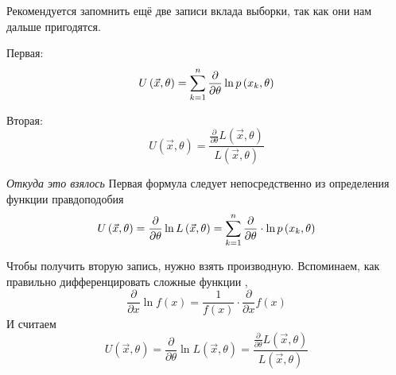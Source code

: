 \begin{remark}\label{remark:defU}
  Рекомендуется запомнить ещё две записи вклада выборки, так как они нам
  дальше пригодятся.

  Первая:
  \begin{align*}
    U\left( \vec{x},\theta \right)
    = \sum_{k=1}^n\frac{\partial}{\partial\theta}\ln{p\left(x_k,\theta\right)}
  \end{align*}

  Вторая:
  $$U\left( \vec{x},\theta \right)
    =\frac{\frac{\partial}{\partial\theta}L\left(\vec{x},\theta\right)}
      {L\left(\vec{x},\theta\right)}$$
\end{remark}
\textit{Откуда это взялось}
Первая формула следует непосредственно из определения функции правдоподобия
$$U\left( \vec{x},\theta \right)
    =\frac{\partial}{\partial\theta}\ln{L\left(\vec{x},\theta\right)}
    =\sum_{k=1}^n
      \frac{\partial}{\partial\theta}\cdot\ln{p\left(x_k,\theta\right)}$$

Чтобы получить вторую запись, нужно взять производную.
Вспоминаем, как правильно дифференцировать сложные функции
\cite[с.~226]{Fichtenholz1}, \cite[с.~133]{DorogovtsevMA}
$$\frac{\partial}{\partial x} \ln{f\left( x \right)}
  = \frac{1}{f\left( x \right)}
    \cdot \frac{\partial}{\partial x} f\left( x \right)$$
И считаем
$$U\left( \vec{x},\theta \right)
  =\frac{\partial}{\partial\theta}\ln{L\left(\vec{x},\theta\right)}
  =\frac{\frac{\partial}{\partial\theta}L\left(\vec{x},\theta\right)}
    {L\left(\vec{x},\theta\right)}$$

